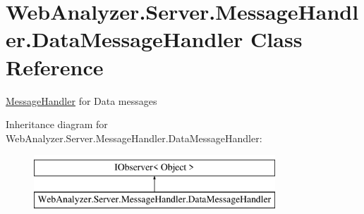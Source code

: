 \hypertarget{class_web_analyzer_1_1_server_1_1_message_handler_1_1_data_message_handler}{}\section{Web\+Analyzer.\+Server.\+Message\+Handler.\+Data\+Message\+Handler Class Reference}
\label{class_web_analyzer_1_1_server_1_1_message_handler_1_1_data_message_handler}


\hyperlink{namespace_web_analyzer_1_1_server_1_1_message_handler}{Message\+Handler} for Data messages  


Inheritance diagram for Web\+Analyzer.\+Server.\+Message\+Handler.\+Data\+Message\+Handler\+:\begin{figure}[H]
\begin{center}
\leavevmode
\includegraphics[height=2.000000cm]{class_web_analyzer_1_1_server_1_1_message_handler_1_1_data_message_handler}
\end{center}
\end{figure}
